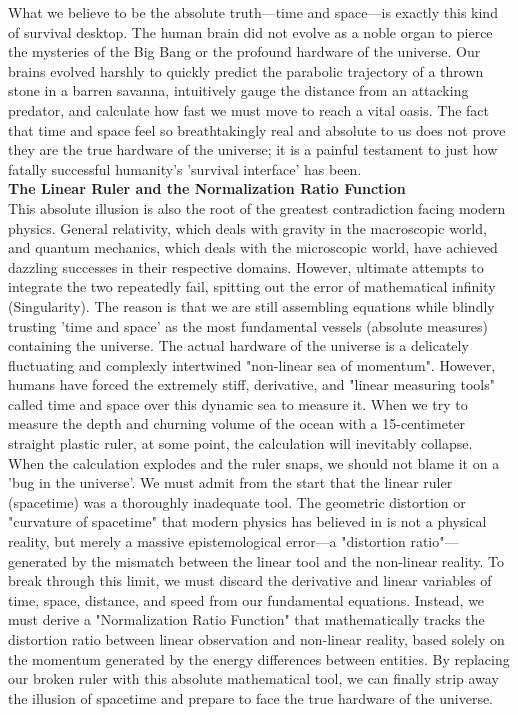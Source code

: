 What we believe to be the absolute truth—time and space—is exactly this kind of survival desktop. The human brain did not evolve as a noble organ to pierce the mysteries of the Big Bang or the profound hardware of the universe. Our brains evolved harshly to quickly predict the parabolic trajectory of a thrown stone in a barren savanna, intuitively gauge the distance from an attacking predator, and calculate how fast we must move to reach a vital oasis. The fact that time and space feel so breathtakingly real and absolute to us does not prove they are the true hardware of the universe; it is a painful testament to just how fatally successful humanity's 'survival interface' has been.\\
\textbf{The Linear Ruler and the Normalization Ratio Function} \\ 
This absolute illusion is also the root of the greatest contradiction facing modern physics. General relativity, which deals with gravity in the macroscopic world, and quantum mechanics, which deals with the microscopic world, have achieved dazzling successes in their respective domains. However, ultimate attempts to integrate the two repeatedly fail, spitting out the error of mathematical infinity (Singularity). The reason is that we are still assembling equations while blindly trusting 'time and space' as the most fundamental vessels (absolute measures) containing the universe.
The actual hardware of the universe is a delicately fluctuating and complexly intertwined "non-linear sea of momentum". However, humans have forced the extremely stiff, derivative, and "linear measuring tools" called time and space over this dynamic sea to measure it. When we try to measure the depth and churning volume of the ocean with a 15-centimeter straight plastic ruler, at some point, the calculation will inevitably collapse.
When the calculation explodes and the ruler snaps, we should not blame it on a 'bug in the universe'. We must admit from the start that the linear ruler (spacetime) was a thoroughly inadequate tool. The geometric distortion or "curvature of spacetime" that modern physics has believed in is not a physical reality, but merely a massive epistemological error—a "distortion ratio"—generated by the mismatch between the linear tool and the non-linear reality.
To break through this limit, we must discard the derivative and linear variables of time, space, distance, and speed from our fundamental equations. Instead, we must derive a "Normalization Ratio Function" that mathematically tracks the distortion ratio between linear observation and non-linear reality, based solely on the momentum generated by the energy differences between entities. By replacing our broken ruler with this absolute mathematical tool, we can finally strip away the illusion of spacetime and prepare to face the true hardware of the universe.
